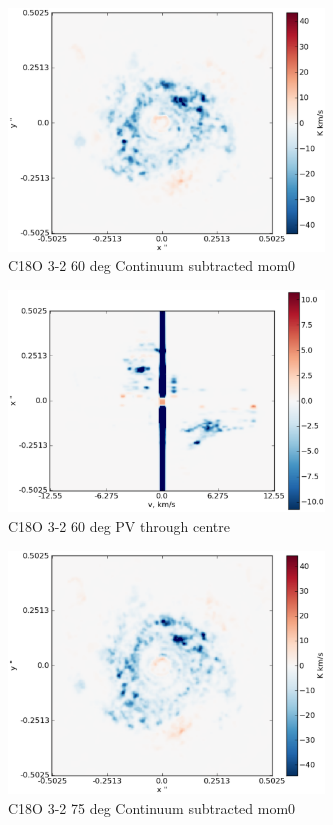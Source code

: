 \documentclass[useAMS,usenatbib]{mn2e}
\begin{document}
\begin{figure}
 \includegraphics[width=84mm]{Figures/sim/imageC18O_3-2_60deg_contSub.eps}

 \caption{C18O 3-2 60 deg Continuum subtracted mom0}
\end{figure}

%

\begin{figure}
 \includegraphics[width=84mm]{Figures/sim/imageC18O_3-2_60deg_PV_centre.eps}

 \caption{C18O 3-2 60 deg PV through centre}
\end{figure}

\begin{figure}
 \includegraphics[width=84mm]{Figures/sim/imageC18O_3-2_75deg_contSub.eps}

 \caption{C18O 3-2 75 deg Continuum subtracted mom0}
\end{figure}
\end{document}
